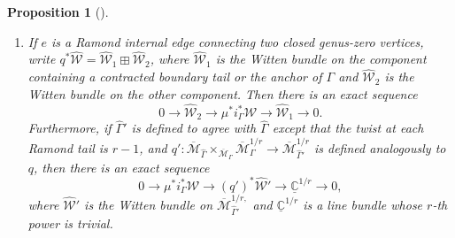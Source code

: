 \documentclass[11pt]{amsart}
\newtheorem{pr}[dummy]{Proposition}
\theoremstyle{definition}
\theoremstyle{remark}
\newcommand{\<}{\left<}
\renewcommand{\>}{\right>}
\numberwithin{equation}{section}
\def\Mbar{{\overline{\mathcal M}}}
\begin{document}
\begin{pr}[{\cite[Proposition 2.20]{TZ1}}]
\begin{enumerate}
\item If $e$ is a Ramond internal edge connecting two closed genus-zero vertices, write %
$q^*\widehat{\mathcal{W}} = \widehat{\mathcal{W}}_1 \boxplus \widehat{\mathcal{W}}_2$, where $\widehat{\mathcal{W}}_1$ is the Witten bundle on the component containing a contracted boundary tail or the anchor %
of $\Gamma$ and %
$\widehat{\mathcal{W}}_2$ is the Witten bundle on the other component.  Then there is an exact sequence
\begin{equation}
\label{eq decompose2}
0 \to \widehat{\mathcal{W}}_2 \to \mu^*i_{\Gamma}^*{\mathcal{W}} \to \widehat{\mathcal{W}}_1 \to 0.
\end{equation}
Furthermore, if $\widehat\Gamma'$ is defined to agree with $\widehat\Gamma$ except that the twist at each Ramond tail is $r-1$, and $q': \Mbar_{\widehat{\Gamma}} \times_{\Mbar_{\Gamma}} \Mbar_{\Gamma}^{1/r} \to \Mbar_{\widehat\Gamma'}^{1/r}$ is defined analogously to $q$, then there is an exact sequence
\begin{equation}
\label{eq decompose3}
0 \to \mu^*i_{\Gamma}^*{\mathcal{W}} \to (q')^*\widehat{{\mathcal{W}}}' \to {\underline{\mathbb{C}}}^{1/r} \to 0,
\end{equation}
where $\widehat{{\mathcal{W}}}'$ is the Witten bundle %
on $\Mbar_{\widehat\Gamma'}^{1/r,}$ and %
${\underline{\mathbb{C}}}^{1/r}$ is a line bundle whose $r$-th power is %
trivial.


\end{enumerate}
\end{pr}
\end{document}
